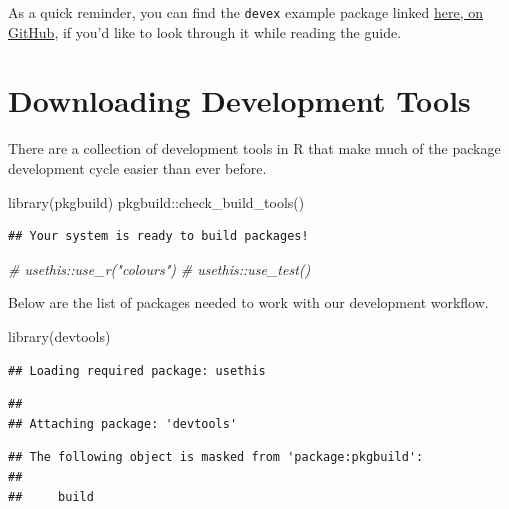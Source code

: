 \documentclass[
]{book}
\newenvironment{Shaded}{\begin{snugshade}}{\end{snugshade}}
\newcommand{\CommentTok}[1]{\textcolor[rgb]{0.56,0.35,0.01}{\textit{#1}}}
\newcommand{\FunctionTok}[1]{\textcolor[rgb]{0.00,0.00,0.00}{#1}}
\newcommand{\NormalTok}[1]{#1}
\newcommand{\SpecialCharTok}[1]{\textcolor[rgb]{0.00,0.00,0.00}{#1}}
\newcommand{\StringTok}[1]{\textcolor[rgb]{0.31,0.60,0.02}{#1}}
\begin{document}
As a quick reminder, you can find the \texttt{devex} example package linked \href{https://github.com/IQSS/Rbuild/tree/master/devex}{here, on GitHub}, if you'd like to look through it while reading the guide.

\hypertarget{downloading-development-tools}{%
\section{Downloading Development Tools}\label{downloading-development-tools}}

There are a collection of development tools in R that make much of the package development cycle easier than ever before.

\begin{Shaded}
\begin{Highlighting}[]
\FunctionTok{library}\NormalTok{(pkgbuild)}
\NormalTok{pkgbuild}\SpecialCharTok{::}\FunctionTok{check\_build\_tools}\NormalTok{()}
\end{Highlighting}
\end{Shaded}

\begin{verbatim}
## Your system is ready to build packages!
\end{verbatim}

\begin{Shaded}
\begin{Highlighting}[]
\CommentTok{\# usethis::use\_r("colours")}
\CommentTok{\# usethis::use\_test()}
\end{Highlighting}
\end{Shaded}

Below are the list of packages needed to work with our development workflow.

\begin{Shaded}
\begin{Highlighting}[]
\FunctionTok{library}\NormalTok{(}\StringTok{\textquotesingle{}devtools\textquotesingle{}}\NormalTok{)}
\end{Highlighting}
\end{Shaded}

\begin{verbatim}
## Loading required package: usethis
\end{verbatim}

\begin{verbatim}
## 
## Attaching package: 'devtools'
\end{verbatim}

\begin{verbatim}
## The following object is masked from 'package:pkgbuild':
## 
##     build
\end{verbatim}
\end{document}
